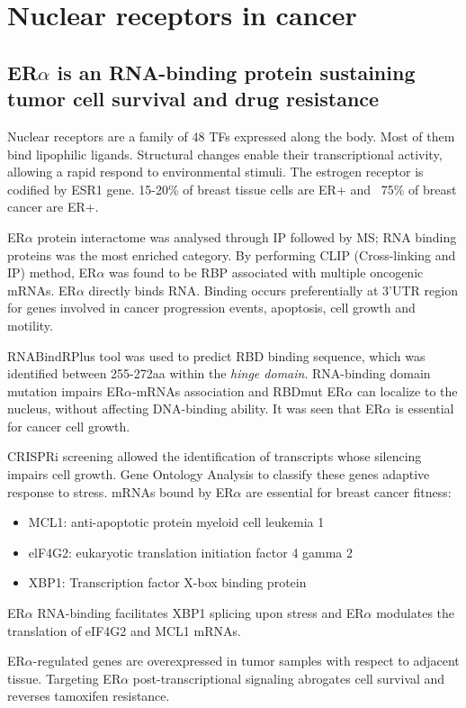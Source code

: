 \section{Nuclear receptors in cancer}
\subsection{ER$\alpha$ is an RNA-binding protein sustaining tumor cell survival and drug resistance}
Nuclear receptors are a family of 48 TFs expressed along the body. Most of them bind lipophilic ligands.
Structural changes enable their transcriptional activity, allowing a rapid respond to environmental stimuli.
The estrogen receptor is codified by ESR1 gene. 15-20\% of breast tissue cells are ER+ and  ~75\% of breast cancer are ER+.

ER$\alpha$ protein interactome was analysed through IP followed by MS; RNA binding proteins was the most enriched category. By performing CLIP (Cross-linking and IP) method, ER$\alpha$ was found to be RBP associated with multiple oncogenic mRNAs.  ER$\alpha$ directly binds RNA. Binding occurs preferentially at 3’UTR region for genes involved in cancer progression events, apoptosis, cell growth and motility.

RNABindRPlus tool was used to predict RBD binding sequence, which was identified between 255-272aa within the \emph{hinge domain}. RNA-binding domain mutation impairs ER$\alpha$-mRNAs association and RBDmut ER$\alpha$ can localize to the nucleus, without affecting DNA-binding ability. It was seen that ER$\alpha$ is essential for cancer cell growth.

CRISPRi screening allowed the identification of transcripts whose silencing impairs cell growth. Gene Ontology Analysis to classify these genes  adaptive response to stress. 
mRNAs bound by  ER$\alpha$ are essential for breast cancer fitness:
\begin{itemize}
\tightlist
\item MCL1: anti-apoptotic protein myeloid cell leukemia 1
\item elF4G2: eukaryotic translation initiation factor 4 gamma 2
\item XBP1: Transcription factor X-box binding protein
\end{itemize}
ER$\alpha$ RNA-binding facilitates XBP1 splicing upon stress and ER$\alpha$  modulates the translation of eIF4G2 and MCL1 mRNAs.

ER$\alpha$-regulated genes are overexpressed in tumor samples with respect to adjacent tissue.
Targeting ER$\alpha$ post-transcriptional signaling abrogates cell survival and reverses tamoxifen resistance.

